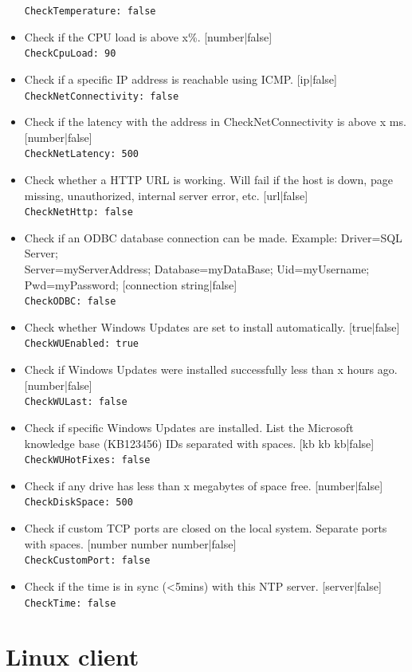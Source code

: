 \documentclass[11pt]{article}
\begin{document}
\begin{itemize}
\texttt{CheckTemperature: false}
\item Check if the CPU load is above x\%. [number|false]\\
\texttt{CheckCpuLoad: 90}
\item Check if a specific IP address is reachable using ICMP. [ip|false]\\
\texttt{CheckNetConnectivity: false}
\item Check if the latency with the address in CheckNetConnectivity is above x ms. [number|false]\\
\texttt{CheckNetLatency: 500}
\item Check whether a HTTP URL is working. Will fail if the host is down, page missing, unauthorized, internal server error, etc. [url|false]\\
\texttt{CheckNetHttp: false}
\item Check if an ODBC database connection can be made. Example: Driver={SQL Server};\\ Server=myServerAddress; Database=myDataBase; Uid=myUsername; Pwd=myPassword; [connection string|false]\\
\texttt{CheckODBC: false}
\item Check whether Windows Updates are set to install automatically. [true|false]\\
\texttt{CheckWUEnabled: true}
\item Check if Windows Updates were installed successfully less than x hours ago. [number|false]\\
\texttt{CheckWULast: false}
\item Check if specific Windows Updates are installed. List the Microsoft knowledge base (KB123456) IDs separated with spaces. [kb kb kb|false]\\
\texttt{CheckWUHotFixes: false}
\item Check if any drive has less than x megabytes of space free. [number|false]\\
\texttt{CheckDiskSpace: 500}
\item Check if custom TCP ports are closed on the local system. Separate ports with spaces. [number number number|false]\\
\texttt{CheckCustomPort: false}
\item Check if the time is in sync (<5mins) with this NTP server. [server|false]\\
\texttt{CheckTime: false}
\end{itemize}

\section{Linux client}
\end{document}
